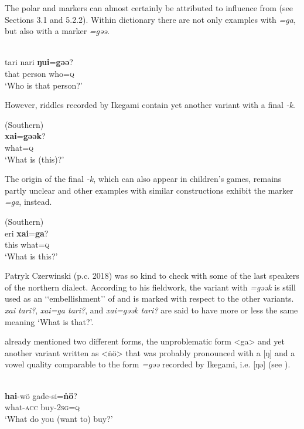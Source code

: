 The  polar and  markers can almost certainly be attributed to influence from  (see Sections 3.1 and 5.2.2). Within  dictionary there are not only examples with \textit{=ga}, but also with a marker \textit{=gəə}.

\ea%
    \label{ex:tungu:57}
    \\
    \gll tari  nari \textbf{{ŋui}}{=}\textbf{{gəə}}?\\
    that  person  who=\textsc{q}\\
    \glt ‘Who is that person?’ \citep[145]{Ikegami1997}
    \z

However, riddles recorded by Ikegami contain yet another variant with a final \textit{-k}.

\ea%
    \label{ex:tungu:58}
     (Southern)\\
    \gll \textbf{{xai}}{=}\textbf{{gəək}}?\\
    what=\textsc{q}\\
    \glt ‘What is (this)?’ \citep[93]{Ikegami1958}
    \z

The origin of the final \textit{-k}, which can also appear in children's games, remains partly unclear and other examples with similar constructions exhibit the marker \textit{=ga}, instead.

\ea%
    \label{ex:tungu:59}
     (Southern)\\
    \gll eri \textbf{{xai}}{=}\textbf{{ga}}?\\
    this  what=\textsc{q}\\
    \glt ‘What is this?’ \citep[15]{Tsumagari2009b}
    \z

Patryk Czerwinski (p.c. 2018) was so kind to check with some of the last speakers of the northern dialect. According to his fieldwork, the variant with \textit{=gəək} is still used as an ‘‘embellishment’’ of  and is marked with respect to the other variants. \textit{xai tari?}, \textit{xai=ga tari?}, and \textit{xai=gəək tari?} are said to have more or less the same meaning ‘What is that?’.

\cite[21, 50]{Nakanome1928} already mentioned two different forms, the unproblematic form <ga> and yet another variant written as <ṅö> that was probably pronounced with a  [ŋ] and a vowel quality comparable to the form \textit{=gəə} recorded by Ikegami, i.e. [ŋə] (see ).

\ea%
    \label{ex:tungu:60}
    \\
    \gll \textbf{{hai}}-wö    gade-si=\textbf{{ṅö}}?\\
    what-\textsc{acc}  buy-2\textsc{sg=q}\\
    \glt ‘What do you (want to) buy?’ \citep[52]{Nakanome1928}
    \z

